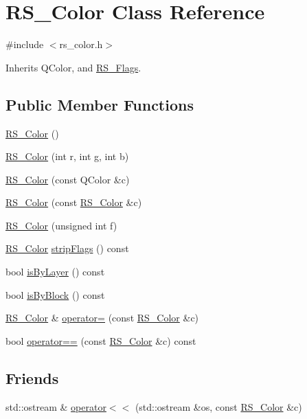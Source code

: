 \hypertarget{class_r_s___color}{\section{R\-S\-\_\-\-Color Class Reference}
\label{class_r_s___color}
}


{\ttfamily \#include $<$rs\-\_\-color.\-h$>$}



Inherits Q\-Color, and \hyperlink{class_r_s___flags}{R\-S\-\_\-\-Flags}.

\subsection*{Public Member Functions}
\begin{DoxyCompactItemize}
\item 
\hyperlink{class_r_s___color_ab66dc940f91691c1042fdf66b233c202}{R\-S\-\_\-\-Color} ()
\item 
\hyperlink{class_r_s___color_a67cb642947852508b764fe24faf6941f}{R\-S\-\_\-\-Color} (int r, int g, int b)
\item 
\hyperlink{class_r_s___color_abbc6313f7a0ff964d2b026556492e96d}{R\-S\-\_\-\-Color} (const Q\-Color \&c)
\item 
\hyperlink{class_r_s___color_a3448d6fba8759e355de76c5c826e85d5}{R\-S\-\_\-\-Color} (const \hyperlink{class_r_s___color}{R\-S\-\_\-\-Color} \&c)
\item 
\hyperlink{class_r_s___color_afca132bc479e49fb149ee0c7fa4684f5}{R\-S\-\_\-\-Color} (unsigned int f)
\item 
\hyperlink{class_r_s___color}{R\-S\-\_\-\-Color} \hyperlink{class_r_s___color_af1afbe8fa974d959fc761e9050104775}{strip\-Flags} () const 
\item 
bool \hyperlink{class_r_s___color_a9ff19dd4aa42140e32801cf386fe16a6}{is\-By\-Layer} () const 
\item 
bool \hyperlink{class_r_s___color_a849e4525af328ac882e38d3e209bc1da}{is\-By\-Block} () const 
\item 
\hyperlink{class_r_s___color}{R\-S\-\_\-\-Color} \& \hyperlink{class_r_s___color_a23177e6321dabb0cbe5931d78b5a5542}{operator=} (const \hyperlink{class_r_s___color}{R\-S\-\_\-\-Color} \&c)
\item 
bool \hyperlink{class_r_s___color_a3b1f23149671afcdeb41dbd1e351ab36}{operator==} (const \hyperlink{class_r_s___color}{R\-S\-\_\-\-Color} \&c) const 
\end{DoxyCompactItemize}
\subsection*{Friends}
\begin{DoxyCompactItemize}
\item 
std\-::ostream \& \hyperlink{class_r_s___color_ac3c08dc2baed981d9a8316a00336b5a7}{operator$<$$<$} (std\-::ostream \&os, const \hyperlink{class_r_s___color}{R\-S\-\_\-\-Color} \&c)
\end{DoxyCompactItemize}


